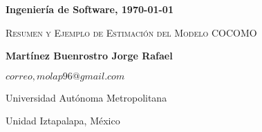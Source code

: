 \documentclass[letterpaper,11pt,twoside]{report}
\date{}
\begin{document}
	\centerline{\bf Ingenier\'ia de Software, \today}
	\centerline{}
	\begin{center}
		\Large{\textsc{Resumen y Ejemplo de Estimaci\'on del Modelo COCOMO}}
	\end{center}
	
	\centerline{}
	\centerline{\textbf{Martínez Buenrostro Jorge Rafael}}
	\centerline{}
	
	\centerline{$correo, molap96@gmail.com$}
	
        \centerline{Universidad Aut\'onoma Metropolitana} 
	\centerline{Unidad Iztapalapa, M\'exico}
	
	\bigskip
	
  \newpage
  
\end{document}
